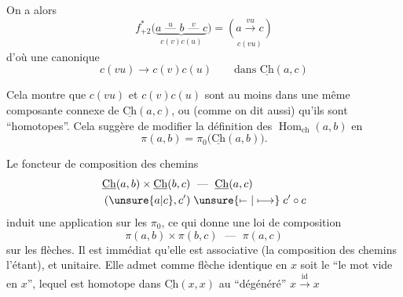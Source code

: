 

On a alors
\[
f_{+2}^{*}\bigl(\underbrace{a\overset{u}{\text{ --- }}b\overset{v}{\text{ --- }}c}_{c(v)c(u)}\bigr)
=\underset{c(vu)}{(a\xrightarrow{vu}c)}
\]
d'où une  canonique
\[
c(vu)\longrightarrow c(v)c(u)\qquad\text{dans }\underline{\mathrm{Ch}}(a,c)
\]

Cela montre que $c(vu)$ et $c(v)c(u)$ sont  au moins dans une même composante connexe de $\underline{\mathrm{Ch}}(a,c)$, ou  (comme on dit aussi) qu'ils sont ``homotopes''. Cela suggère  de  modifier la définition des $\operatorname{Hom}_{\mathrm{ch}}(a,b)$ en
\[
\pi(a,b)=\pi_0\bigl(\underline{\mathrm{Ch}}(a,b)\bigr).
\]

Le foncteur de composition des chemins
\[
\begin{aligned}
\underline{\mathrm{Ch}}(a,b)\times\underline{\mathrm{Ch}}(b,c)&\;\text{ --- }\;\underline{\mathrm{Ch}}(a,c)\\
(\unsure{a|c},c')&\;\unsure{\mathrel{\mapstochar\relbar}|\longmapsto}\;c'\circ c
\end{aligned}
\]
induit une  application sur les $\pi_0$, ce qui donne une loi de composition
\[
\pi(a,b)\times\pi(b,c)\;\text{ --- }\;\pi(a,c)
\]
sur les flèches. Il est immédiat qu'elle est associative (la composition des chemins l'étant), et unitaire. Elle admet comme flèche identique en $x$ soit le   ``le mot vide en $x$'', lequel est  homotope dans $\underline{\mathrm{Ch}}(x,x)$ au  ``dégénéré'' $x\xrightarrow{\mathrm{id}}x$
